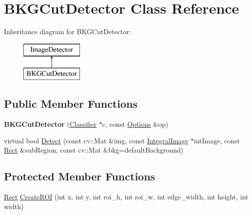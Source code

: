 \hypertarget{classBKGCutDetector}{}\section{B\+K\+G\+Cut\+Detector Class Reference}
\label{classBKGCutDetector}
Inheritance diagram for B\+K\+G\+Cut\+Detector\+:\begin{figure}[H]
\begin{center}
\leavevmode
\includegraphics[height=2.000000cm]{classBKGCutDetector}
\end{center}
\end{figure}
\subsection*{Public Member Functions}
\begin{DoxyCompactItemize}
\item 
\hypertarget{classBKGCutDetector_aa2daa11dc23936ccbb48ff3b356dfabb}{}{\bfseries B\+K\+G\+Cut\+Detector} (\hyperlink{classClassifier}{Classifier} $\ast$c, const \hyperlink{structOptions}{Options} \&op)\label{classBKGCutDetector_aa2daa11dc23936ccbb48ff3b356dfabb}

\item 
virtual bool \hyperlink{classBKGCutDetector_af20d7a8db9419da74cafdf977eed9c29}{Detect} (const cv\+::\+Mat \&img, const \hyperlink{classIntegralImage}{Integral\+Image} $\ast$int\+Image, const \hyperlink{classRect}{Rect} \&sub\+Region, const cv\+::\+Mat \&bkg=default\+Background)
\end{DoxyCompactItemize}
\subsection*{Protected Member Functions}
\begin{DoxyCompactItemize}
\item 
\hyperlink{classRect}{Rect} \hyperlink{classBKGCutDetector_aae6a1f123251f5fd1fddce6e8828b36a}{Create\+R\+O\+I} (int x, int y, int roi\+\_\+h, int roi\+\_\+w, int edge\+\_\+width, int height, int width)
\end{DoxyCompactItemize}
